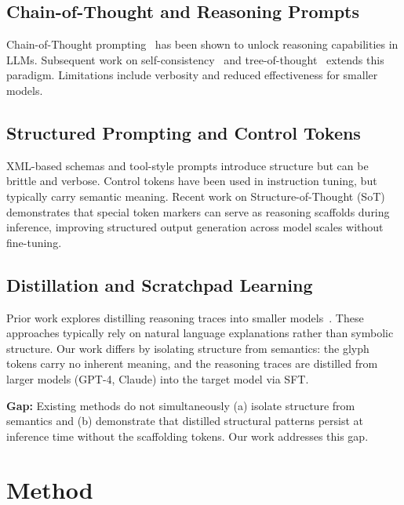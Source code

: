 \documentclass[11pt]{article}
\begin{document}
\subsection{Chain-of-Thought and Reasoning Prompts}

Chain-of-Thought prompting~\citep{wei2022chain} has been shown to unlock reasoning capabilities in LLMs. Subsequent work on self-consistency~\citep{wang2022self} and tree-of-thought~\citep{yao2023tree} extends this paradigm. Limitations include verbosity and reduced effectiveness for smaller models.

\subsection{Structured Prompting and Control Tokens}

XML-based schemas and tool-style prompts introduce structure but can be brittle and verbose. Control tokens have been used in instruction tuning, but typically carry semantic meaning. Recent work on Structure-of-Thought (SoT)~\citep{t2sbench2025} demonstrates that special token markers can serve as reasoning scaffolds during inference, improving structured output generation across model scales without fine-tuning.

\subsection{Distillation and Scratchpad Learning}

Prior work explores distilling reasoning traces into smaller models~\citep{magister2022teaching}. These approaches typically rely on natural language explanations rather than symbolic structure. Our work differs by isolating structure from semantics: the glyph tokens carry no inherent meaning, and the reasoning traces are distilled from larger models (GPT-4, Claude) into the target model via SFT.

\textbf{Gap:} Existing methods do not simultaneously (a) isolate structure from semantics and (b) demonstrate that distilled structural patterns persist at inference time without the scaffolding tokens. Our work addresses this gap.

\section{Method}
\end{document}
